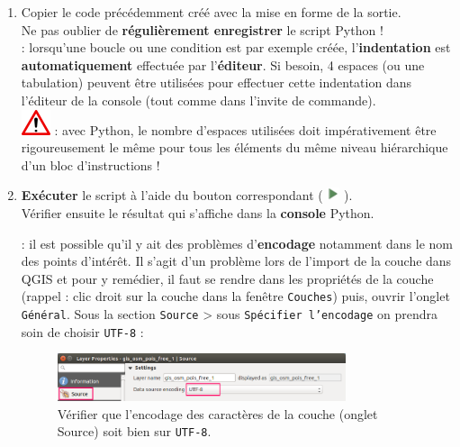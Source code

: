 \documentclass[11pt]{article}
\begin{document}
\begin{enumerate}
\begin{itemize}
\end{itemize}


\item Copier le code précédemment créé avec la mise en forme de la sortie. \\
Ne pas oublier de \textbf{régulièrement enregistrer} le script Python !\\ 






\newpage{}
\underline{}: lorsqu'une boucle ou une condition est par exemple créée, l'\textbf{indentation} est \textbf{automatiquement} effectuée par l'\textbf{éditeur}. Si besoin, 4 espaces (ou une tabulation) peuvent être utilisées pour effectuer cette indentation dans l'éditeur de la console (tout comme dans l'invite de commande).\\

\includegraphics[scale=1]{warningt.png} \underline{}: avec Python, le nombre d'espaces utilisées doit impérativement être rigoureusement le même pour tous les éléments du même niveau hiérarchique d'un bloc d'instructions !

\vspace*{0.32em}
\item \textbf{Exécuter} le script à l'aide du bouton correspondant ( \includegraphics[width=1em]{mActionStart.png} ). \\
Vérifier ensuite le résultat qui s'affiche dans la \textbf{console} Python.


\underline{}: il est possible qu'il y ait des problèmes d'\textbf{encodage} notamment dans le nom des points d'intérêt. Il s'agit d'un problème lors de l'import de la couche dans QGIS et pour y remédier, il faut se rendre dans les propriétés de la couche (rappel : clic droit sur la couche dans la fenêtre \og{}\texttt{Couches}\fg{}) puis, ouvrir l'onglet \texttt{Général}. Sous la section \og{}\texttt{Source}\fg{} > sous \og{}\texttt{Spécifier l'encodage}\fg{} on prendra soin de choisir \og{}\texttt{UTF-8}\fg{} :
\vspace*{-0.4em}
\begin{figure}[H]
\centering
\includegraphics[width=0.8\textwidth]{utf8.png}
\vspace*{-0.4em}
\caption{Vérifier que l'encodage des caractères de la couche (onglet \og{}Source\fg{}) soit bien sur \texttt{UTF-8}.}
\label{utf8}
\end{figure}
\vspace*{-1em}



\end{enumerate}
\end{document}
